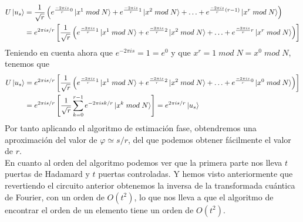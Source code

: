 \documentclass[a4paper]{article}
\numberwithin{equation}{section}
\newcommand{\modd}{\; mod \;}
\begin{document}
\begin{equation}
\begin{split}
U\ket{u_s} &=
\frac{1}{\sqrt{r}} \left(
e^{\frac{-2\pi is}{r}0} \ket{x^1 \modd N} +
e^{\frac{-2\pi is}{r}1} \ket{x^2 \modd N} + \ldots +
e^{\frac{-2\pi is}{r}(r-1)} \ket{x^r \modd N} \right)
\\ &=
e^{2\pi is/r} \left[
\frac{1}{\sqrt{r}} \left(
e^{\frac{-2\pi is}{r}1} \ket{x^1 \modd N} +
e^{\frac{-2\pi is}{r}2} \ket{x^2 \modd N} + \ldots +
e^{\frac{-2\pi is}{r}r} \ket{x^r \modd N} \right) \right]
\end{split}
\end{equation}
Teniendo en cuenta ahora que $e^{-2\pi is} = 1 = e^0$ y que $x^r = 1 \modd N = x^0 \modd N$, tenemos que
\begin{equation}
\begin{split}
U\ket{u_s} &=
e^{2\pi is/r} \left[
\frac{1}{\sqrt{r}} \left(
e^{\frac{-2\pi is}{r}1} \ket{x^1 \modd N} +
e^{\frac{-2\pi is}{r}2} \ket{x^2 \modd N} + \ldots +
e^{\frac{-2\pi is}{r}0} \ket{x^0 \modd N} \right) \right]
\\ &=
e^{2\pi is/r} \left[ \frac{1}{\sqrt{r}} \sum_{k=0}^{r-1} e^{-2\pi isk/r}\ket{x^k \modd N} \right]
= e^{2\pi is/r} \ket{u_s}
\end{split}
\end{equation}
Por tanto aplicando el algoritmo de estimación fase, obtendremos una aproximación del valor de $\varphi \simeq s/r$, del que podemos obtener fácilmente el valor de $r$.\\
\linebreak
En cuanto al orden del algoritmo podemos ver que la primera parte nos lleva $t$ puertas de Hadamard y $t$ puertas controladas. Y hemos visto anteriormente que revertiendo el circuito anterior obtenemos la inversa de la transformada cuántica de Fourier, con un orden de $O(t^2)$, lo que nos lleva a que el algoritmo de encontrar el orden de un elemento tiene un orden de $O(t^2)$.
\end{document}
